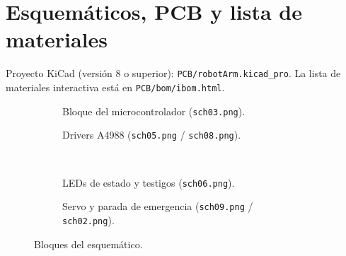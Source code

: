 \section{Esquemáticos, PCB y lista de materiales}\label{anx:pcb}
Proyecto KiCad (versión 8 o superior): \texttt{PCB/robotArm.kicad\_pro}. La lista de materiales
interactiva está en \texttt{PCB/bom/ibom.html}.


\begin{figure}[!htbp]
\centering
\begin{subfigure}{0.48\textwidth}\centering
  \caption{Bloque del microcontrolador (\texttt{sch03.png}).}
\end{subfigure}\hfill
\begin{subfigure}{0.48\textwidth}\centering
  \caption{Drivers A4988 (\texttt{sch05.png} / \texttt{sch08.png}).}
\end{subfigure}\\[6pt]
\begin{subfigure}{0.48\textwidth}\centering
  \caption{LEDs de estado y testigos (\texttt{sch06.png}).}
\end{subfigure}\hfill
\begin{subfigure}{0.48\textwidth}\centering
  \caption{Servo y parada de emergencia (\texttt{sch09.png} / \texttt{sch02.png}).}
\end{subfigure}
\caption{Bloques del esquemático.}\label{fig:sch-bloques}
\end{figure}



